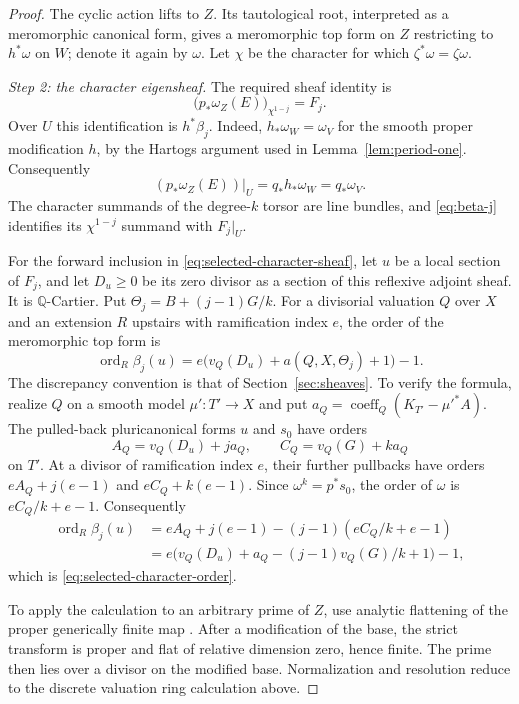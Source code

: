\documentclass[11pt,a4paper]{article}
\numberwithin{equation}{section}
\theoremstyle{definition}
\theoremstyle{remark}
\newcommand{\Q}{\mathbb Q}\newcommand{\R}{\mathbb R}
\newcommand{\ord}{\operatorname{ord}}\newcommand{\per}{\operatorname{per}}
\begin{document}
\begin{proof}
The cyclic action lifts to $Z$. Its tautological root, interpreted as
a meromorphic canonical form, gives a meromorphic top form on $Z$
restricting to $h^*\omega$ on $W$; denote it again by $\omega$.
Let $\chi$ be the character for which $\zeta^*\omega=\zeta\omega$.

\smallskip\noindent\emph{Step 2: the character eigensheaf.}
The required sheaf identity is
\begin{equation}\label{eq:selected-character-sheaf}
 \bigl(p_*\omega_Z(E)\bigr)_{\chi^{1-j}}=F_j.
\end{equation}
Over $U$ this identification is $h^*\beta_j$. Indeed,
$h_*\omega_W=\omega_V$ for the smooth proper modification $h$, by
the Hartogs argument used in Lemma~\ref{lem:period-one}. Consequently
\[
 (p_*\omega_Z(E))|_U=q_*h_*\omega_W=q_*\omega_V.
\]
The character summands of the degree-$k$ torsor are line bundles, and
\eqref{eq:beta-j} identifies its $\chi^{1-j}$ summand with $F_j|_U$.

For the forward inclusion in \eqref{eq:selected-character-sheaf}, let
$u$ be a local section of $F_j$, and let $D_u\ge0$ be its zero divisor
as a section of this reflexive adjoint sheaf. It is $\Q$-Cartier.
Put $\Theta_j=B+(j-1)G/k$. For a divisorial valuation $Q$ over $X$
and an extension $R$ upstairs with ramification index $e$, the order
of the meromorphic top form is
\begin{equation}\label{eq:selected-character-order}
 \ord_R\beta_j(u)
 =e\bigl(v_Q(D_u)+a(Q,X,\Theta_j)+1\bigr)-1.
\end{equation}
The discrepancy convention is that of Section~\ref{sec:sheaves}.
To verify the formula, realize $Q$ on a smooth model $\mu':T'\to X$
and put $a_Q=\operatorname{coeff}_Q(K_{T'}-\mu'^*A)$.
The pulled-back pluricanonical forms $u$ and $s_0$ have orders
\[
 A_Q=v_Q(D_u)+ja_Q,\qquad C_Q=v_Q(G)+ka_Q
\]
on $T'$. At a divisor of ramification index $e$, their further
pullbacks have orders $eA_Q+j(e-1)$ and $eC_Q+k(e-1)$.
Since $\omega^k=p^*s_0$, the order of $\omega$ is
$eC_Q/k+e-1$. Consequently
\[
\begin{aligned}
 \ord_R\beta_j(u)
 &=eA_Q+j(e-1)-(j-1)(eC_Q/k+e-1)\\
 &=e\bigl(v_Q(D_u)+a_Q-(j-1)v_Q(G)/k+1\bigr)-1,
\end{aligned}
\]
which is \eqref{eq:selected-character-order}.

To apply the calculation to an arbitrary prime of $Z$, use analytic
flattening of the proper generically finite map \cite{Hironaka1975}.
After a modification of the base, the strict transform is proper and
flat of relative dimension zero, hence finite. The prime then lies over
a divisor on the modified base. Normalization and resolution reduce to
the discrete valuation ring calculation above.


\end{proof}
\end{document}
